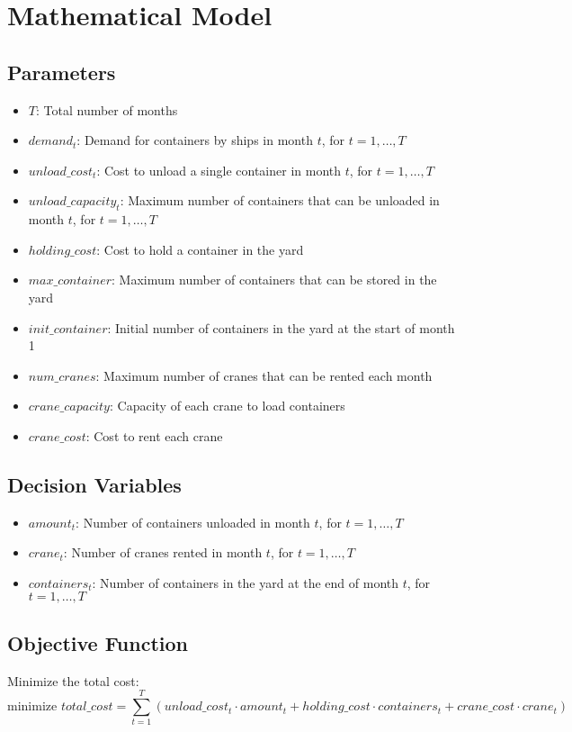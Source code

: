 \documentclass{article}
\begin{document}
\section*{Mathematical Model}

\subsection*{Parameters}
\begin{itemize}
    \item $T$: Total number of months
    \item $demand_t$: Demand for containers by ships in month $t$, for $t = 1, \ldots, T$
    \item $unload\_cost_t$: Cost to unload a single container in month $t$, for $t = 1, \ldots, T$
    \item $unload\_capacity_t$: Maximum number of containers that can be unloaded in month $t$, for $t = 1, \ldots, T$
    \item $holding\_cost$: Cost to hold a container in the yard
    \item $max\_container$: Maximum number of containers that can be stored in the yard
    \item $init\_container$: Initial number of containers in the yard at the start of month 1
    \item $num\_cranes$: Maximum number of cranes that can be rented each month
    \item $crane\_capacity$: Capacity of each crane to load containers
    \item $crane\_cost$: Cost to rent each crane
\end{itemize}

\subsection*{Decision Variables}
\begin{itemize}
    \item $amount_t$: Number of containers unloaded in month $t$, for $t = 1, \ldots, T$
    \item $crane_t$: Number of cranes rented in month $t$, for $t = 1, \ldots, T$
    \item $containers_t$: Number of containers in the yard at the end of month $t$, for $t = 1, \ldots, T$
\end{itemize}

\subsection*{Objective Function}
Minimize the total cost:
\[
\text{minimize } total\_cost = \sum_{t=1}^{T} \left( unload\_cost_t \cdot amount_t + holding\_cost \cdot containers_t + crane\_cost \cdot crane_t \right)
\]
\end{document}
